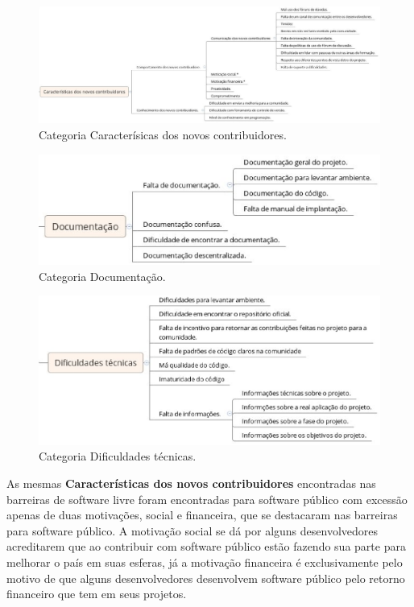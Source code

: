 \begin{figure}[h]
	\centering
	\label{fig:caracteristicas}
		\includegraphics[keepaspectratio=true,scale=0.35]{figuras/caracteristicas.eps}
	\caption{Categoria Caracterísicas dos novos contribuidores.}
\end{figure}

\begin{figure}[h]
	\centering
	\label{fig:documentacao}
		\includegraphics[keepaspectratio=true,scale=0.5]{figuras/documentacao.eps}
	\caption{Categoria Documentação.}
\end{figure}

\begin{figure}[h]
	\centering
	\label{fig:dificuldades}
		\includegraphics[keepaspectratio=true,scale=0.5]{figuras/dificuldades.eps}
	\caption{Categoria Dificuldades técnicas.}
\end{figure}

As mesmas \textbf{Características dos novos contribuidores} encontradas nas barreiras
de software livre foram encontradas para software público com excessão apenas de duas
motivações, social e financeira, que se destacaram nas barreiras para software público.
A motivação social se dá por alguns desenvolvedores acreditarem que ao contribuir com 
software público estão fazendo sua parte para melhorar o país em suas esferas, já
a motivação financeira é exclusivamente pelo motivo de que alguns desenvolvedores
desenvolvem software público pelo retorno financeiro que tem em seus projetos.


